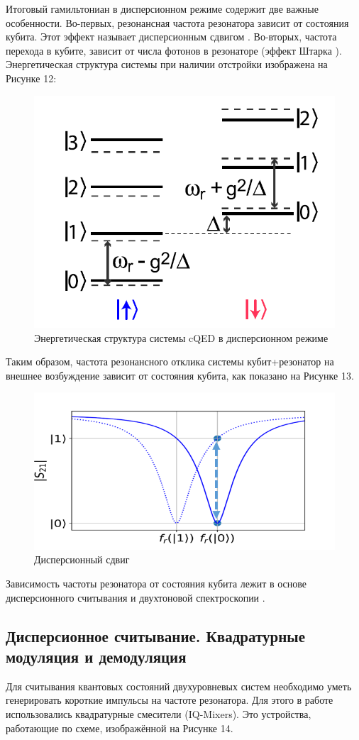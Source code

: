 Итоговый гамильтониан в дисперсионном режиме содержит две важные особенности. Во-первых, резонансная частота резонатора зависит от состояния кубита. Этот эффект называет дисперсионным сдвигом \cite{Stammeier}. Во-вторых, частота перехода в кубите, зависит от числа фотонов в резонаторе (эффект Штарка \cite{Kox2013}). Энергетическая структура системы при наличии отстройки изображена на Рисунке 12:

\begin{figure}[h]
	\centering
	\includegraphics[width=0.5\linewidth]{pictures/JCenergy}
	\caption{Энергетическая структура системы cQED в дисперсионном режиме}
	\label{fig:jcenergy}
\end{figure}

Таким образом, частота резонансного отклика системы кубит+резонатор на внешнее возбуждение зависит от состояния кубита, как показано на Рисунке 13.
\begin{figure}[!h]
	\centering
	\includegraphics[width=0.5\linewidth]{pictures/dispshift}
	\caption{Дисперсионный сдвиг}
	\label{fig:dispshift}
\end{figure}
 
Зависимость частоты резонатора от состояния кубита лежит в основе дисперсионного считывания \cite{Chen2012} и двухтоновой спектроскопии \cite{Leng2011}. 

\subsection{Дисперсионное считывание. Квадратурные модуляция и демодуляция}
Для считывания квантовых состояний двухуровневых систем необходимо уметь генерировать короткие импульсы на частоте резонатора. Для этого  в работе использовались квадратурные смесители (IQ-Mixers). Это устройства, работающие по схеме, изображённой на Рисунке 14.

